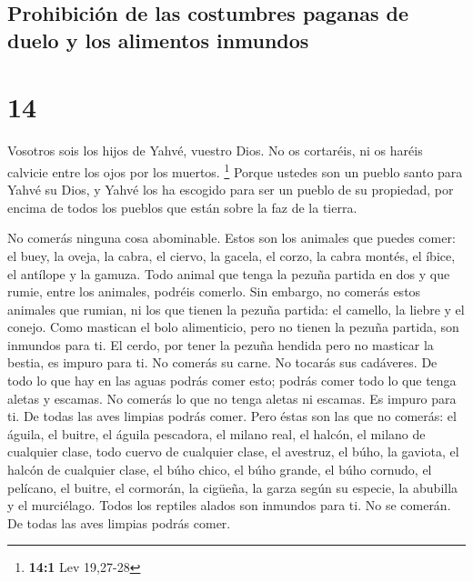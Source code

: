 \hypertarget{prohibiciuxf3n-de-las-costumbres-paganas-de-duelo-y-los-alimentos-inmundos}{%
\subsection{Prohibición de las costumbres paganas de duelo y los
alimentos
inmundos}\label{prohibiciuxf3n-de-las-costumbres-paganas-de-duelo-y-los-alimentos-inmundos}}

\hypertarget{section-13}{%
\section{14}\label{section-13}}

 Vosotros sois los hijos de Yahvé, vuestro Dios. No os
cortaréis, ni os haréis calvicie entre los ojos por los muertos.
\footnote{\textbf{14:1} Lev 19,27-28}  Porque ustedes son
un pueblo santo para Yahvé su Dios, y Yahvé los ha escogido para ser un
pueblo de su propiedad, por encima de todos los pueblos que están sobre
la faz de la tierra.

 No comerás ninguna cosa abominable.  Estos
son los animales que puedes comer: el buey, la oveja, la cabra,
 el ciervo, la gacela, el corzo, la cabra montés, el
íbice, el antílope y la gamuza.  Todo animal que tenga la
pezuña partida en dos y que rumie, entre los animales, podréis comerlo.
 Sin embargo, no comerás estos animales que rumian, ni los
que tienen la pezuña partida: el camello, la liebre y el conejo. Como
mastican el bolo alimenticio, pero no tienen la pezuña partida, son
inmundos para ti.  El cerdo, por tener la pezuña hendida
pero no masticar la bestia, es impuro para ti. No comerás su carne. No
tocarás sus cadáveres.  De todo lo que hay en las aguas
podrás comer esto; podrás comer todo lo que tenga aletas y escamas.
 No comerás lo que no tenga aletas ni escamas. Es impuro
para ti.  De todas las aves limpias podrás comer.
 Pero éstas son las que no comerás: el águila, el buitre,
el águila pescadora,  el milano real, el halcón, el
milano de cualquier clase,  todo cuervo de cualquier
clase,  el avestruz, el búho, la gaviota, el halcón de
cualquier clase,  el búho chico, el búho grande, el búho
cornudo,  el pelícano, el buitre, el cormorán,
 la cigüeña, la garza según su especie, la abubilla y el
murciélago.  Todos los reptiles alados son inmundos para
ti. No se comerán.  De todas las aves limpias podrás
comer.

